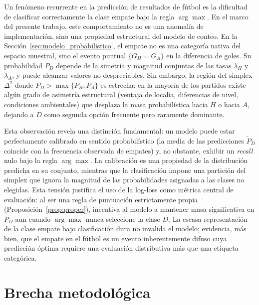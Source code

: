 Un fen\'omeno recurrente en la predicci\'on de resultados de f\'utbol es la dificultad de clasificar correctamente la clase empate bajo la regla $\arg\max$. En el marco del presente trabajo, este comportamiento no es una anomal\'ia de implementaci\'on, sino una propiedad estructural del modelo de conteo. En la Secci\'on~\ref{sec:modelo_probabilistico}, el empate no es una categor\'ia nativa del espacio muestral, sino el evento puntual $\{G_H = G_A\}$ en la diferencia de goles. Su probabilidad $P_D$ depende de la simetr\'ia y magnitud conjuntas de las tasas $\lambda_H$ y $\lambda_A$, y puede alcanzar valores no despreciables. Sin embargo, la regi\'on del simplex $\Delta^2$ donde $P_D > \max\{P_H, P_A\}$ es estrecha: en la mayor\'ia de los partidos existe alg\'un grado de asimetr\'ia estructural (ventaja de local\'ia, diferencias de nivel, condiciones ambientales) que desplaza la masa probabil\'istica hacia $H$ o hacia $A$, dejando a $D$ como segunda opci\'on frecuente pero raramente dominante.

Esta observaci\'on revela una distinci\'on fundamental: un modelo puede estar perfectamente calibrado en sentido probabil\'istico (la media de las predicciones $\tilde{P}_D$ coincide con la frecuencia observada de empates) y, no obstante, exhibir un \emph{recall} nulo bajo la regla $\arg\max$. La calibraci\'on es una propiedad de la distribuci\'on predicha en su conjunto, mientras que la clasificaci\'on impone una partici\'on del simplex que ignora la magnitud de las probabilidades asignadas a las clases no elegidas. Esta tensi\'on justifica el uso de la log-loss como m\'etrica central de evaluaci\'on: al ser una regla de puntuaci\'on estrictamente propia (Proposici\'on~\ref{prop:proper}), incentiva al modelo a mantener masa significativa en $P_D$ aun cuando $\arg\max$ nunca seleccione la clase $D$. La escasa representaci\'on de la clase empate bajo clasificaci\'on dura no invalida el modelo; evidencia, m\'as bien, que el empate en el f\'utbol es un evento inherentemente difuso cuya predicci\'on \'optima requiere una evaluaci\'on distributiva m\'as que una etiqueta categ\'orica.

\section{Brecha metodol\'ogica}
\label{sec:brecha}

